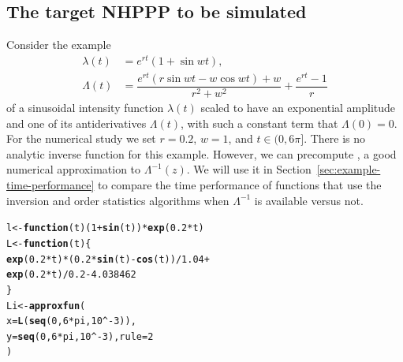 \documentclass[article,nojss]{jss}\usepackage[]{graphicx}\usepackage[]{xcolor}
\makeatletter
\newcommand{\hlnum}[1]{\textcolor[rgb]{0.686,0.059,0.569}{#1}}%
\newcommand{\hlopt}[1]{\textcolor[rgb]{0,0,0}{#1}}%
\newcommand{\hlstd}[1]{\textcolor[rgb]{0.345,0.345,0.345}{#1}}%
\newcommand{\hlkwa}[1]{\textcolor[rgb]{0.161,0.373,0.58}{\textbf{#1}}}%
\newcommand{\hlkwb}[1]{\textcolor[rgb]{0.69,0.353,0.396}{#1}}%
\newcommand{\hlkwc}[1]{\textcolor[rgb]{0.333,0.667,0.333}{#1}}%
\newcommand{\hlkwd}[1]{\textcolor[rgb]{0.737,0.353,0.396}{\textbf{#1}}}%
\newenvironment{kframe}{%
 \def\at@end@of@kframe{}%
 \ifinner\ifhmode%
  \def\at@end@of@kframe{\end{minipage}}%
  \begin{minipage}{\columnwidth}%
 \fi\fi%
 \def\FrameCommand##1{\hskip\@totalleftmargin \hskip-\fboxsep
 \colorbox{shadecolor}{##1}\hskip-\fboxsep
     \hskip-\linewidth \hskip-\@totalleftmargin \hskip\columnwidth}%
 \MakeFramed {\advance\hsize-\width
   \@totalleftmargin\z@ \linewidth\hsize
   \@setminipage}}%
 {\par\unskip\endMakeFramed%
 \at@end@of@kframe}
\newenvironment{knitrout}{}{} %
\newcommand{\fct}[1]{\code{#1()}}
\makeatother
\begin{document}
\subsection{The target NHPPP to be simulated}\label{sec:illustration-target}

Consider the example
\begin{equation}\label{eq:illustration}
\begin{aligned}
\lambda(t) &= e^{rt}(1+\sin wt), \\
\Lambda(t) &= \dfrac{e^{rt}(r\sin wt - w\cos wt) + w}{r^2+w^2}+\dfrac{e^{rt}-1}{r} %
\end{aligned}
\end{equation}
of a sinusoidal intensity function $\lambda(t)$ scaled to have an exponential amplitude and one of its antiderivatives $\Lambda(t)$, with such a constant term that $\Lambda(0)=0$.  For the numerical study we set $r=0.2$, $w=1$, and $t \in (0, 6\pi]$. There is no  analytic inverse function for this example.
However, we can precompute \fct{Li}, a good numerical approximation to $\Lambda^{-1}(z)$. We will use it in Section~\ref{sec:example-time-performance} to compare the time performance of functions that use the inversion and order statistics algorithms when $\Lambda^{-1}$ is available versus not.
\begin{knitrout}
\color{fgcolor}\begin{kframe}
\begin{alltt}
\hlstd{l} \hlkwb{<-} \hlkwa{function}\hlstd{(}\hlkwc{t}\hlstd{) (}\hlnum{1} \hlopt{+} \hlkwd{sin}\hlstd{(t))} \hlopt{*} \hlkwd{exp}\hlstd{(}\hlnum{0.2} \hlopt{*} \hlstd{t)}
\hlstd{L} \hlkwb{<-} \hlkwa{function}\hlstd{(}\hlkwc{t}\hlstd{) \{}
  \hlkwd{exp}\hlstd{(}\hlnum{0.2} \hlopt{*} \hlstd{t)} \hlopt{*} \hlstd{(}\hlnum{0.2} \hlopt{*} \hlkwd{sin}\hlstd{(t)} \hlopt{-} \hlkwd{cos}\hlstd{(t))} \hlopt{/} \hlnum{1.04} \hlopt{+}
    \hlkwd{exp}\hlstd{(}\hlnum{0.2} \hlopt{*} \hlstd{t)} \hlopt{/} \hlnum{0.2} \hlopt{-} \hlnum{4.038462}
\hlstd{\}}
\hlstd{Li} \hlkwb{<-} \hlkwd{approxfun}\hlstd{(}
  \hlkwc{x} \hlstd{=} \hlkwd{L}\hlstd{(}\hlkwd{seq}\hlstd{(}\hlnum{0}\hlstd{,} \hlnum{6} \hlopt{*} \hlstd{pi,} \hlnum{10}\hlopt{^-}\hlnum{3}\hlstd{)),}
  \hlkwc{y} \hlstd{=} \hlkwd{seq}\hlstd{(}\hlnum{0}\hlstd{,} \hlnum{6} \hlopt{*} \hlstd{pi,} \hlnum{10}\hlopt{^-}\hlnum{3}\hlstd{),} \hlkwc{rule} \hlstd{=} \hlnum{2}
\hlstd{)}
\end{alltt}
\end{kframe}
\end{knitrout}
\end{document}
